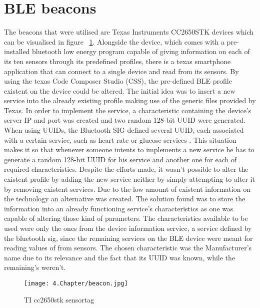\section{ \ac{BLE} beacons}
\label{sec:beacon}


The beacons that were utilised are Texas Instruments CC2650STK devices which can be visualised in figure ~\ref{fig:beacon}. Alongside the device, which comes with a pre-installed bluetooth low energy program capable of giving information on each of its ten sensors through its predefined profiles, there is a texas smartphone application that can connect to a single device and read from its sensors. By using the texas Code Composer Studio (CSS), the pre-defined \ac{BLE} profile existent on the device could be altered.
The initial idea was to insert a new service into the already existing profile making use of the generic files provided by Texas. 
In order to implement the service, a characteristic containing the device's server IP and port was created and two random 128-bit UUID were generated. When using UUIDs, the Bluetooth SIG defined several UUID, each associated with a certain service, such as heart rate or glucose services \cite{bleservices}. This situation makes it so that whenever someone intents to implements a new service he has to generate a random 128-bit UUID for his service and another one for each of required characteristics.
Despite the efforts made, it wasn't possible to alter the existent profile by adding the new service neither by simply attempting to alter it by removing existent services. Due to the low amount of existent information on the technology an alternative was created. The solution found was to store the information into an already functioning service's characteristics as one was capable of altering those kind of parameters. The characteristics available to be used were only the ones from the device information service, a service defined by the bluetooth sig, since the remaining services on the \ac{BLE} device were meant for reading values of from sensors. The chosen characteristic was the Manufacturer's name due to its relevance and the fact that its UUID was known, while the remaining's weren't.


\begin{figure}
	\centering
		\texttt{[image: 4.Chapter/beacon.jpg]}
	\caption[TI cc2650stk sensortag]{TI cc2650stk sensortag}
	\label{fig:beacon}
\end{figure}
